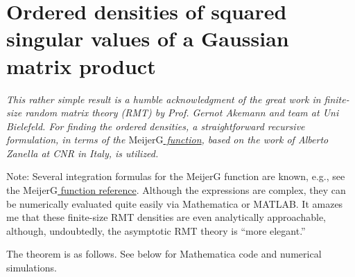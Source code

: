 \section{Ordered densities of squared singular values of a Gaussian matrix product}

\newcommand{\G}[7]{\mathrm{G}^{\tiny\begin{bmatrix}
			#1&#2\\#3&#4
	\end{bmatrix}}\left(\begin{matrix}
		#5 \\ #6
	\end{matrix}\;\middle|\;#7\right)}

\emph{This rather simple result is a humble acknowledgment of the great work in finite-size random matrix theory (RMT) by Prof. Gernot Akemann and team at Uni Bielefeld. For finding the ordered densities, a straightforward recursive formulation, in terms of the \href{https://mathworld.wolfram.com/MeijerG-Function.html}{$\mathrm{MeijerG}$ function}, based on the work of Alberto Zanella at CNR in Italy, is utilized.}

Note: Several integration formulas for the MeijerG function are known, e.g., see the \href{https://mathworld.wolfram.com/MeijerG-Function.html}{$\mathrm{MeijerG}$ function reference}. Although the expressions are complex, they can be numerically evaluated quite easily via Mathematica or MATLAB. It amazes me that these finite-size RMT densities are even analytically approachable, although, undoubtedly, the asymptotic RMT theory is ``more elegant.''

The theorem is as follows. See below for Mathematica code and numerical simulations.

